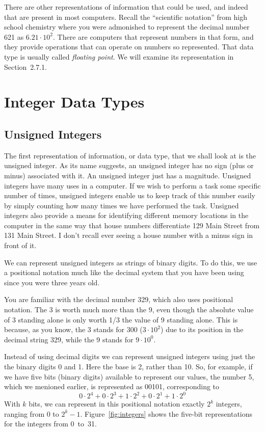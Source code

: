 \documentclass{patt}
\begin{document}
There are other representations of information that could be used, and
indeed that are present in most computers.  Recall the ``scientific
notation'' from high school chemistry where you were admonished to
represent the decimal number 621 as $6.21{\cdot} 10^2$. There are
computers that represent numbers in that form, and they provide
operations that can operate on numbers so represented.  That data type
is usually called {\em floating point}. We will examine its
representation in Section~2.7.1.

\section{Integer Data Types}

\subsection{Unsigned Integers}

The first representation of information, or data type, that we shall
look at is the unsigned integer.  As its name suggests, an unsigned integer
has no sign (plus or minus) associated with it.  An unsigned integer just has
a magnitude.  Unsigned integers have many uses in
a computer.  If we wish to perform a task some
specific number of times, unsigned integers enable us to keep track of
this number easily by simply counting how many times we have performed
the task.  Unsigned integers also provide a means for
identifying different memory locations in the computer in the same
way that house numbers differentiate 129 Main Street from 131 Main Street.
I don't recall ever seeing a house number with a minus sign in front of it.

We can represent unsigned integers as strings of binary digits.  To do
this, we use a positional notation much like the decimal system that
you have been using since you were three years old.

You are familiar with the decimal number 329, which also uses
positional notation.  The 3 is worth much more than the 9, even though
the absolute value of 3 standing alone is only worth 1/3 the value of
9 standing alone.  This is because, as you know, the 3 stands for 300
($3\cdot 10^2$) due to its position in the decimal string 329, while
the 9 stands for $9\cdot 10^0$.

Instead of using decimal digits we can represent unsigned integers using
just the the binary digits 0 and 1.  Here the base is 2, rather
than 10.  So, for example, if we have five bits (binary digits) available 
to represent our values, the number 5, which we menioned earlier, is 
represented as 00101, corresponding to
\begin{equation*}
0\cdot 2^4+0 \cdot 2^3+1\cdot 2^2+0\cdot 2^1+1\cdot 2^0
\end{equation*}
With $k$ bits, we can represent in this positional notation exactly
$2^k$ integers, ranging from 0 to $2^k-1$.  Figure~\ref{fig:integers}
shows the five-bit representations for the integers from 0~to~31.
\end{document}
